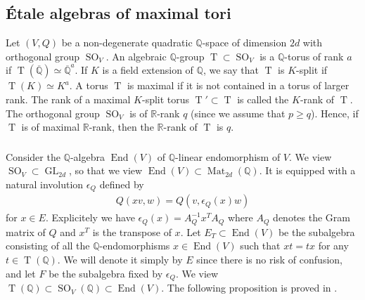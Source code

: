 \documentclass[11pt]{article} %
\newcommand{\8}{\infty}
\newcommand{\Tbf}{\operatorname{T}}
\newcommand{\Qbar}{\overline{\Q}}
\newcommand{\SO}{\operatorname{SO}}
\newcommand{\GL}{\operatorname{GL}}
\newcommand{\R}{\mathbb{R}}
\newcommand{\Q}{\mathbb{Q}}
\newcommand{\End}{\operatorname{End}}
\newcommand{\Mat}{\operatorname{Mat}}
\theoremstyle{mytheoremstyle}
\theoremstyle{remark}
\numberwithin{equation}{section}
\begin{document}
\subsection{\'Etale algebras of maximal tori} \label{maxtorss}

Let $(V,Q)$ be a non-degenerate quadratic $\Q$-space of dimension $2d$ with orthogonal group $\SO_V$. An algebraic $\Q$-group $\Tbf \subset \SO_V$ is a $\Q$-torus of rank $a$ if $\Tbf(\Qbar) \simeq \Qbar^a$. If $K$ is a field extension of $\Q$, we say that $\Tbf$ is $K$-split if $\Tbf(K)\simeq K^a$. A torus $\Tbf$ is maximal if { it is not contained in a torus of larger rank}. The rank of a maximal $K$-split torus $\Tbf' \subset \Tbf$ is called the $K$-rank of $\Tbf$. The orthogonal group $\SO_V$ is of $\R$-rank $q$ (since we assume that $p\geq q$). Hence, if $\Tbf$ is of maximal $\R$-rank, then the $\R$-rank of $\Tbf$ is $q$.
\subsubsection{} Consider the $\Q$-algebra $\End(V)$ of $\Q$-linear endomorphism of $V$. We view $\SO_V \subset \GL_{2d}$, so that we view $\End(V) \subset \Mat_{2d}(\Q)$. It is equipped with a natural involution $\epsilon_Q$ defined by 
\begin{align*}
    Q(xv,w)=Q(v,\epsilon_Q(x)w)
\end{align*}
for $x \in E$. Explicitely we have $\epsilon_Q(x)=A^{-1}_Qx^TA_Q$ where $A_Q$ denotes the Gram matrix of $Q$ and $x^T$ is the transpose of $x$. Let $E_T \subset \End(V)$ be the subalgebra consisting of all the $\Q$-endomorphisms $x \in \End(V)$ such that $xt=tx$ for any $t \in {\Tbf}(\Q)$. We will denote it simply by $E$ since there is no risk of confusion, and let $F$ be the subalgebra fixed by $\epsilon_Q$. We view $\Tbf(\Q) \subset \SO_V(\Q) \subset \End(V)$. The following proposition is proved in \cite[Proposition.~3.3]{maxtor1}. 
\end{document}
